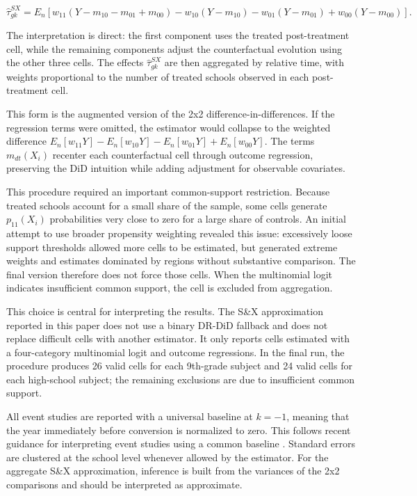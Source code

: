 \begin{equation}
\widehat{\tau}_{gk}^{SX} =
E_n\left[
w_{11}(Y-m_{10}-m_{01}+m_{00})
-w_{10}(Y-m_{10})
-w_{01}(Y-m_{01})
+w_{00}(Y-m_{00})
\right].
\end{equation}

The interpretation is direct: the first component uses the treated post-treatment cell, while the remaining components adjust the counterfactual evolution using the other three cells. The effects $\widehat{\tau}_{gk}^{SX}$ are then aggregated by relative time, with weights proportional to the number of treated schools observed in each post-treatment cell.

This form is the augmented version of the 2x2 difference-in-differences. If the regression terms were omitted, the estimator would collapse to the weighted difference $E_n[w_{11}Y]-E_n[w_{10}Y]-E_n[w_{01}Y]+E_n[w_{00}Y]$. The terms $m_{dt}(X_i)$ recenter each counterfactual cell through outcome regression, preserving the DiD intuition while adding adjustment for observable covariates.

This procedure required an important common-support restriction. Because treated schools account for a small share of the sample, some cells generate $p_{11}(X_i)$ probabilities very close to zero for a large share of controls. An initial attempt to use broader propensity weighting revealed this issue: excessively loose support thresholds allowed more cells to be estimated, but generated extreme weights and estimates dominated by regions without substantive comparison. The final version therefore does not force those cells. When the multinomial logit indicates insufficient common support, the cell is excluded from aggregation.

This choice is central for interpreting the results. The S\&X approximation reported in this paper does not use a binary DR-DiD fallback and does not replace difficult cells with another estimator. It only reports cells estimated with a four-category multinomial logit and outcome regressions. In the final run, the procedure produces 26 valid cells for each 9th-grade subject and 24 valid cells for each high-school subject; the remaining exclusions are due to insufficient common support.

All event studies are reported with a universal baseline at $k=-1$, meaning that the year immediately before conversion is normalized to zero. This follows recent guidance for interpreting event studies using a common baseline \parencite{baker2025, roth_interpreting_2026}. Standard errors are clustered at the school level whenever allowed by the estimator. For the aggregate S\&X approximation, inference is built from the variances of the 2x2 comparisons and should be interpreted as approximate.

